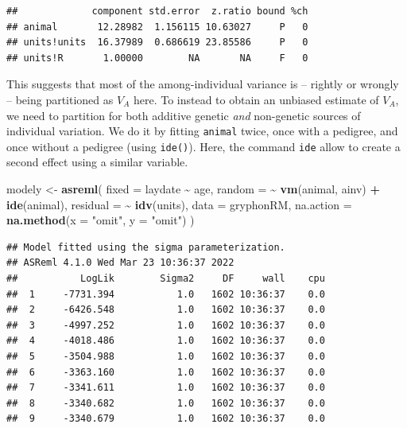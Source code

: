 \documentclass[
  12pt,
]{book}
\newenvironment{Shaded}{\begin{snugshade}}{\end{snugshade}}
\newcommand{\DataTypeTok}[1]{\textcolor[rgb]{0.13,0.29,0.53}{#1}}
\newcommand{\KeywordTok}[1]{\textcolor[rgb]{0.13,0.29,0.53}{\textbf{#1}}}
\newcommand{\NormalTok}[1]{#1}
\newcommand{\OperatorTok}[1]{\textcolor[rgb]{0.81,0.36,0.00}{\textbf{#1}}}
\newcommand{\StringTok}[1]{\textcolor[rgb]{0.31,0.60,0.02}{#1}}
\begin{document}
\begin{Shaded}
\end{Shaded}

\begin{verbatim}
##             component std.error  z.ratio bound %ch
## animal       12.28982  1.156115 10.63027     P   0
## units!units  16.37989  0.686619 23.85586     P   0
## units!R       1.00000        NA       NA     F   0
\end{verbatim}

This suggests that most of the among-individual variance is -- rightly or wrongly -- being partitioned as \(V_A\) here. To instead to obtain an unbiased estimate of \(V_A\), we need to partition for both additive genetic \emph{and} non-genetic sources of individual variation. We do it by fitting \texttt{animal} twice, once with a pedigree, and once without a pedigree (using \texttt{ide()}).
Here, the command \texttt{ide} allow to create a second effect using a similar variable.

\begin{Shaded}
\begin{Highlighting}[]
\NormalTok{modely \textless{}{-}}\StringTok{ }\KeywordTok{asreml}\NormalTok{(}
  \DataTypeTok{fixed =}\NormalTok{ laydate }\OperatorTok{\textasciitilde{}}\StringTok{ }\NormalTok{age,}
  \DataTypeTok{random =} \OperatorTok{\textasciitilde{}}\StringTok{ }\KeywordTok{vm}\NormalTok{(animal, ainv) }\OperatorTok{+}\StringTok{ }\KeywordTok{ide}\NormalTok{(animal),}
  \DataTypeTok{residual =} \OperatorTok{\textasciitilde{}}\StringTok{ }\KeywordTok{idv}\NormalTok{(units),}
  \DataTypeTok{data =}\NormalTok{ gryphonRM,}
  \DataTypeTok{na.action =} \KeywordTok{na.method}\NormalTok{(}\DataTypeTok{x =} \StringTok{"omit"}\NormalTok{, }\DataTypeTok{y =} \StringTok{"omit"}\NormalTok{)}
\NormalTok{)}
\end{Highlighting}
\end{Shaded}

\begin{verbatim}
## Model fitted using the sigma parameterization.
## ASReml 4.1.0 Wed Mar 23 10:36:37 2022
##           LogLik        Sigma2     DF     wall    cpu
##  1     -7731.394           1.0   1602 10:36:37    0.0
##  2     -6426.548           1.0   1602 10:36:37    0.0
##  3     -4997.252           1.0   1602 10:36:37    0.0
##  4     -4018.486           1.0   1602 10:36:37    0.0
##  5     -3504.988           1.0   1602 10:36:37    0.0
##  6     -3363.160           1.0   1602 10:36:37    0.0
##  7     -3341.611           1.0   1602 10:36:37    0.0
##  8     -3340.682           1.0   1602 10:36:37    0.0
##  9     -3340.679           1.0   1602 10:36:37    0.0
\end{verbatim}
\end{document}
